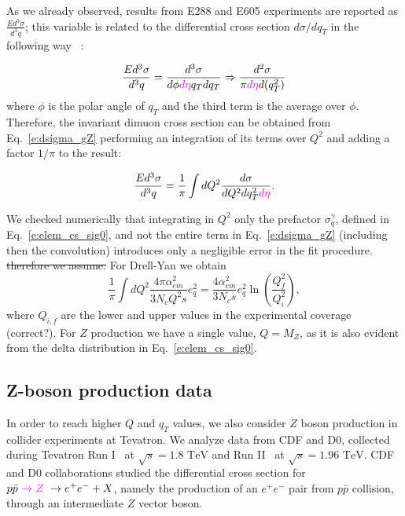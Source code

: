 \documentclass[aps,preprintnumbers,showpacs,nofootinbib,superscriptaddress,floatfix]{revtex4}
\newcommand{\AS}[1]{{\textcolor[rgb]{1,0,1}{#1}}}
\begin{document}
As we already observed, results from E288 and E605 experiments are reported as $\frac{Ed^3\sigma}{d^3q}$; this variable is related \AS{to} the differential cross section $d\sigma/dq_T$ in the following way~\cite{Olive:2016xmw} :

\begin{equation}
\frac{Ed^3\sigma}{d^3q}=\frac{d^3\sigma}{d\phi \AS{d\eta} q_T dq_T} \Rightarrow \frac{d^2\sigma}{\pi \AS{d\eta} d(q^2_T)}
\end{equation}
where \AS{$\phi$ is the polar angle of $q_T$ and} the third term is the average over $\phi$.
Therefore, the invariant dimuon cross section can be obtained from Eq.~\ref{e:dsigma_gZ} performing an integration of its terms over $Q^2$ and adding a factor $1/\pi$ to the result:

\begin{equation}
\frac{Ed^3\sigma}{d^3q} = \frac{1}{\pi} \int dQ^2 \frac{d\sigma}{dQ^2dq^2_T \AS{d\eta}} .
\end{equation}

We checked \AS{numerically} that integrating in $Q^2$ only the prefactor $\sigma_q^\gamma$, defined in Eq.~\ref{e:elem_cs_sig0}, and not the entire term in Eq.~\ref{e:dsigma_gZ} (including then the convolution) introduces only a negligible error in the fit procedure. \AS{\sout{therefore we assume:} For Drell-Yan we obtain}
\begin{equation}
\frac{1}{\pi}  \int dQ^2 \frac{4\pi \alpha^2_{em}}{3N_cQ^2 s} e_q^2 
= \frac{4\alpha_{em}^2}{3 N_c s} e_q^2 \ln \left( \frac{Q_f^2}{Q_i^2} \right) ,
\end{equation}
\AS{where $Q_{i,f}$ are the lower and upper values in the experimental coverage (correct?). For $Z$ production we have a single value, $Q=M_Z$, as it is also evident from the delta distribution in Eq.~\eqref{e:elem_cs_sig0}.}

\subsection{Z-boson production data}
\label{ss:zboson}

In order to reach higher $Q$ and $q_T$ values, we also consider $Z$ boson production in collider experiments at Tevatron. 
We analyze data from CDF and D0, collected during Tevatron Run I~\cite{Affolder:1999jh,Abbott:1999wk} at $\sqrt{s}=1.8\text{ TeV}$ and Run II~\cite{Aaltonen:2012fi,Abazov:2007ac} at $\sqrt{s}=1.96\text{ TeV}$. 
CDF and D0 collaborations studied the differential cross section for $p\bar{p}\ \AS{\rightarrow Z}\ \rightarrow e^+e^- + X$, \AS{namely} the production of an $e^+e^-$ \AS{pair} from $p\bar{p}$ collision,  through an intermediate $Z$ vector boson. 
\end{document}
